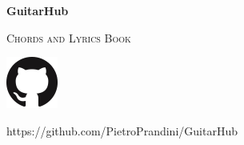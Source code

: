 
\begin{titlepage}
	\centering
	{\sffamily\huge\bfseries GuitarHub\par}
	{\ttfamily\scshape\Large Chords and Lyrics Book\par}
	\includegraphics[scale=0.3]{img/GitHub-Mark-64px}\par %
	{\ttfamily\footnotesize https://github.com/PietroPrandini/GuitarHub\par}
\end{titlepage}

